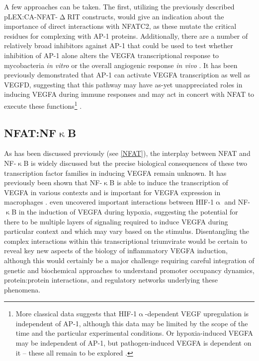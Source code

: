A few approaches can be taken. The first, utilizing the previously described pLEX:CA\hyp{}NFAT\hyp{}$\upDelta$RIT constructs, would give an indication about the importance of direct interactions with NFATC2, as these mutate the critical residues for complexing with AP\hyp{}1 proteins. Additionally, there are a number of relatively broad inhibitors against AP\hyp{}1 that could be used to test whether inhibition of AP\hyp{}1 alone alters the VEGFA transcriptional response to mycobacteria \textit{in vitro} or the overall angiogenic response \textit{in vivo} \citep{Makino2017, Huang1997}. It has been previously demonstrated that AP\hyp{}1 can activate VEGFA transcription as well as VEGFD, suggesting that this pathway may have as\hyp{}yet unappreciated roles in inducing VEGFA during immune responses and may act in concert with NFAT to execute these functions\footnote{More classical data suggests that HIF\hyp{}1$\upalpha$\hyp{}dependent VEGF upregulation is independent of AP\hyp{}1, although this data may be limited by the scope of the time and the particular experimental conditions. Or hypoxia\hyp{}induced VEGFA may be independent of AP\hyp{}1, but pathogen\hyp{}induced VEGFA is dependent on it -- these all remain to be explored \citep{Finkenzeller1995}.} \citep{Shih2001, Debinski2001, Wang2016, Josko2004, Guo2022}.

\subsection{NFAT:NF$\upkappa$B}\label{nfatnfkb}

As has been discussed previously (see \autoref{NFAT}), the interplay between NFAT and NF\hyp{}$\upkappa$B is widely discussed but the precise biological consequences of these two transcription factor families in inducing VEGFA remain unknown. It has previously been shown that NF\hyp{}$\upkappa$B is able to induce the transcription of VEGFA in various contexts \citep{Xie2010, Greenberger2010, Lukiw2003} and is important for VEGFA expression in macrophages \citep{Kiriakidis2003}. \citet{Lukiw2003} even uncovered important interactions between HIF\hyp{}1$\upalpha$ and NF\hyp{}$\upkappa$B in the induction of VEGFA during hypoxia, suggesting the potential for there to be multiple layers of signaling required to induce VEGFA during particular context and which may vary based on the stimulus. Disentangling the complex interactions within this transcriptional triumvirate would be certain to reveal key new aspects of the biology of inflammatory VEGFA induction, although this would certainly be a major challenge requiring careful integration of genetic and biochemical approaches to understand promoter occupancy dynamics, protein:protein interactions, and regulatory networks underlying these phenomena.

